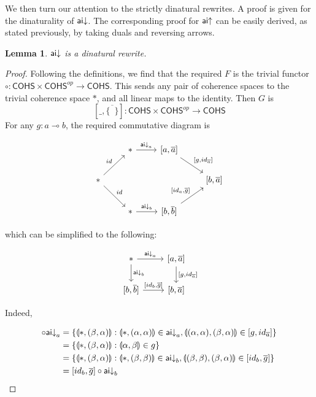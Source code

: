 \documentclass[11pt, oneside]{article}
\theoremstyle{plain}
\newtheorem{lemma}[theorem]{Lemma}
\theoremstyle{definition}
\newcommand{\lp}{\llparenthesis}
\newcommand{\rp}{\rrparenthesis}
\newcommand{\cohs}{{\mathsf{COHS}}}
\newcommand{\comp}{\mathbin{\circ}}
\newcommand{\unit}{\circ}
\begin{document}
We then turn our attention to the strictly dinatural rewrites.
A proof is given for the dinaturality of ${\mathsf {ai}}{\downarrow}$.
The corresponding proof for ${\mathsf {ai}}{ \uparrow}$ can be easily derived, as stated previously, by taking duals and reversing arrows.

\begin{lemma}
${\mathsf {ai}}{\downarrow}$ is a dinatural rewrite.
\end{lemma}

\begin{proof}
Following the definitions, we find that the required $F$ is the trivial functor $\unit:\cohs\times\cohs^{op}\to\cohs$.
This sends any pair of coherence spaces to the trivial coherence space $*$, and all linear maps to the identity.
Then $G$ is
$$[\_,\overline{\{\enspace\}}]:\cohs\times\cohs^{op}\to\cohs$$
For any $g:a\multimap b$, the required commutative diagram is

\[
\begin{tikzcd}
    & * \arrow[r,"\aiD_{a}"] & {[a,\overline{a}]} \arrow[rd,"{[g,id_{\overline{a}}]}"] \\
    * \arrow[ru,"id"] \arrow[rd,"id"] &&& {[b,\overline{a}]} \\
    & * \arrow[r,"\aiD_{b}"] & {[b,\overline{b}]} \arrow[ru,"{[id_a,\overline{g}]}"]
\end{tikzcd}
\]

which can be simplified to the following:

\[
\begin{tikzcd}
    * \arrow[r, "\aiD_{a}"]\arrow[d,"\aiD_{b}"] & {[a,\overline{a}]} \arrow[d,"{[g,id_{\overline{a}}]}"] \\
    {[b,\overline{b}]} \arrow[r,"{[id_b,\overline{g}]}"] & {[b,\overline{a}]}
\end{tikzcd}
\]

Indeed,

\begin{align*}
    [g,id_{\overline{a}}]\comp\aiD_{a} &= \{\lp*,(\beta,\alpha)\rp:\lp*,(\alpha,\alpha)\rp\in \aiD_{a},\lp(\alpha,\alpha),(\beta,\alpha)\rp\in[g,id_{\overline{a}}]\} \\
    &= \{\lp*,(\beta,\alpha)\rp:\lp\alpha,\beta\rp\in g\} \\
    &= \{\lp*,(\beta,\alpha)\rp:\lp*,(\beta,\beta)\rp\in \aiD_{b},\lp(\beta,\beta),(\beta,\alpha)\rp\in[id_{b},\overline{g}]\}\\
    &= [id_b,\overline{g}]\comp\aiD_{b}
\end{align*}
\end{proof}
\end{document}
